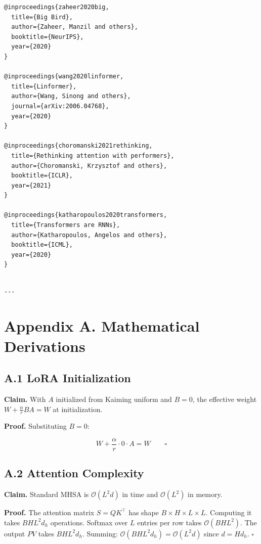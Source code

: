 \begin{lstlisting}
@inproceedings{zaheer2020big,
  title={Big Bird},
  author={Zaheer, Manzil and others},
  booktitle={NeurIPS},
  year={2020}
}

@inproceedings{wang2020linformer,
  title={Linformer},
  author={Wang, Sinong and others},
  journal={arXiv:2006.04768},
  year={2020}
}

@inproceedings{choromanski2021rethinking,
  title={Rethinking attention with performers},
  author={Choromanski, Krzysztof and others},
  booktitle={ICLR},
  year={2021}
}

@inproceedings{katharopoulos2020transformers,
  title={Transformers are RNNs},
  author={Katharopoulos, Angelos and others},
  booktitle={ICML},
  year={2020}
}
\end{lstlisting}
\begin{lstlisting}

---
\end{lstlisting}


\section{Appendix A. Mathematical Derivations}

\subsection{A.1 LoRA Initialization}

\textbf{Claim.} With $A$ initialized from Kaiming uniform and $B = 0$, the 
effective weight $W + \frac{\alpha}{r} B A = W$ at initialization.

\textbf{Proof.} Substituting $B = 0$:

\[
W + \frac{\alpha}{r} \cdot 0 \cdot A = W \qquad \square
\]

\subsection{A.2 Attention Complexity}

\textbf{Claim.} Standard MHSA is $\mathcal{O}(L^2 d)$ in time and $\mathcal{O}(L^2)$ 
in memory.

\textbf{Proof.} The attention matrix $S = Q K^\top$ has shape $B \times H \times L \times L$. 
Computing it takes $B H L^2 d_h$ operations. Softmax over $L$ entries per 
row takes $\mathcal{O}(B H L^2)$. The output $P V$ takes $B H L^2 d_h$. 
Summing: $\mathcal{O}(B H L^2 d_h) = \mathcal{O}(L^2 d)$ since $d = H d_h$. $\square$

